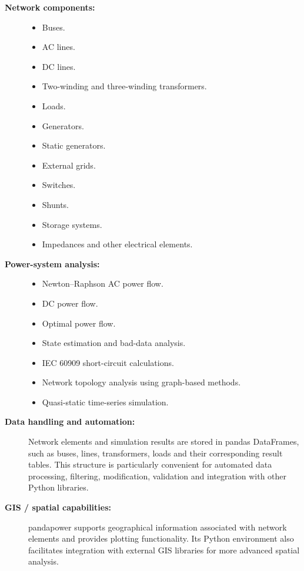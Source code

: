 \begin{description}
    \item[\textbf{Network components:}] \hfill
    \begin{itemize}
        \item Buses.
        \item AC lines.
        \item DC lines.
        \item Two-winding and three-winding transformers.
        \item Loads.
        \item Generators.
        \item Static generators.
        \item External grids.
        \item Switches.
        \item Shunts.
        \item Storage systems.
        \item Impedances and other electrical elements.
    \end{itemize}

    \item[\textbf{Power-system analysis:}] \hfill
    \begin{itemize}
        \item Newton--Raphson AC power flow.
        \item DC power flow.
        \item Optimal power flow.
        \item State estimation and bad-data analysis.
        \item IEC 60909 short-circuit calculations.
        \item Network topology analysis using graph-based methods.
        \item Quasi-static time-series simulation.
    \end{itemize}

    \item[\textbf{Data handling and automation:}]
    Network elements and simulation results are stored in pandas DataFrames,
    such as buses, lines, transformers, loads and their corresponding result
    tables. This structure is particularly convenient for automated data
    processing, filtering, modification, validation and integration with
    other Python libraries.

    \item[\textbf{GIS / spatial capabilities:}]
    pandapower supports geographical information associated with network
    elements and provides plotting functionality. Its Python environment
    also facilitates integration with external GIS libraries for more
    advanced spatial analysis.


\end{description}
